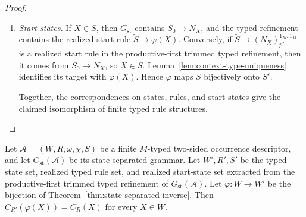 \documentclass[sub]{jalc}
\newcommand{\eM}{1_M}
\begin{document}
\begin{proof}
\begin{enumerate}[label=\textup{(\arabic*)},leftmargin=2.4em]
\item \emph{Start states.} If \(X\in S\), then \(G_{\mathrm{st}}\) contains \(S_0\to N_X\), and the typed refinement contains the realized start rule \(\widetilde S\to\varphi(X)\). Conversely, if \(\widetilde S\to (N_X)_{p'}^{\eM,\eM}\) is a realized start rule in the productive-first trimmed typed refinement, then it comes from \(S_0\to N_X\), so \(X\in S\). Lemma~\ref{lem:context-type-uniqueness} identifies its target with \(\varphi(X)\). Hence \(\varphi\) maps \(S\) bijectively onto \(S'\).

Together, the correspondences on states, rules, and start states give the claimed isomorphism of finite typed rule structures.
\end{enumerate}
\end{proof}

\begin{lemma}
\label{lem:context-closure-state-separated}
Let \(\mathcal A=(W,R,\omega,\chi,S)\) be a finite \(M\)-typed two-sided occurrence descriptor, and let \(G_{\mathrm{st}}(\mathcal A)\) be its state-separated grammar. Let \(W',R',S'\) be the typed state set, realized typed rule set, and realized start-state set extracted from the productive-first trimmed typed refinement of \(G_{\mathrm{st}}(\mathcal A)\). Let \(\varphi:W\to W'\) be the bijection of Theorem~\ref{thm:state-separated-inverse}. Then \(C_{R'}(\varphi(X))=C_R(X)\) for every \(X\in W\).
\end{lemma}
\end{document}

